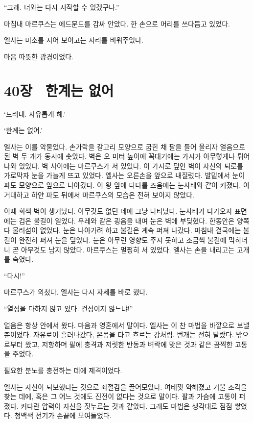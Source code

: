 ``그래. 너와는 다시 시작할 수 있겠구나.''

마침내 마르쿠스는 에드문드를 감싸 안았다. 한 손으로 머리를 쓰다듬고 있었다.

엘사는 미소를 지어 보이고는 자리를 비워주었다.

마음 따뜻한 광경이었다.



\chapter[40장  한계는 없어][40장\hspace*{.5em}한계는 없어]{40장 \ 한계는 없어}



\forceindent`드러내. 자유롭게 해.'

`한계는 없어.'

엘사는 이를 악물었다. 손가락을 갈고리 모양으로 굽힌 채 팔을 들어 올리자 얼음으로 된 벽 두 개가 동시에 솟았다. 벽은 오 미터 높이에 꼭대기에는 가시가 아무렇게나 튀어나와 있었다. 벽 사이에는 마르쿠스가 서 있었다. 이 가시로 덮인 벽이 자신의 퇴로를 가로막자 눈을 가늘게 뜨고 있었다. 엘사는 오른손을 앞으로 내질렀다. 발밑에서 눈이 파도 모양으로 앞으로 나아갔다. 이 왕 앞에 다다를 즈음에는 눈사태와 같이 커졌다. 이 거대하고 하얀 파도 뒤에서 마르쿠스의 모습은 전혀 보이지 않았다.

이때 회색 벽이 생겨났다. 아무것도 없던 데에 그냥 나타났다. 눈사태가 다가오자 표면에는 검은 불길이 일었다. 우레와 같은 굉음을 내며 눈은 벽에 부딪혔다. 한동안은 양쪽 다 물러섬이 없었다. 눈은 나아가려 하고 불길은 계속 퍼져 나갔다. 마침내 결국에는 불길이 완전히 퍼져 눈을 덮었다. 눈은 아무런 영향도 주지 못하고 조금씩 불길에 먹히더니 곧 아무것도 남지 않았다. 마르쿠스는 멀쩡히 서 있었다. 엘사는 손을 내리고는 고개를 숙였다.

``다시!''

마르쿠스가 외쳤다. 엘사는 다시 자세를 바로 했다.

``열성을 다하지 않고 있다. 건성이지 않느냐!''

얼음은 항상 안에서 왔다. 마음과 영혼에서 말이다. 엘사는 이 찬 마법을 바깥으로 보낼 뿐이었다. 자유로이 흘러나갔다, 온몸을 타고 흐르는 강처럼. 번개는 전혀 달랐다. 밖으로부터 왔고, 저항하며 팔에 충격과 저릿한 반동과 벼락에 맞은 것과 같은 끔찍한 고통을 주었다.

필요한 분노를 충전하는 데에 제격이었다.

엘사는 자신이 퇴보했다는 것으로 좌절감을 끌어모았다. 여태껏 약해졌고 거울 조각을 찾는 데에, 혹은 그 어느 것에도 진전이 없다는 것으로 말이다. 팔과 가슴에 고통이 퍼졌다. 커다란 압력이 자신을 짓누르는 것과 같았다. 그래도 마법은 생각대로 점점 쌓였다. 청백색 전기가 손끝에 모여들었다.

